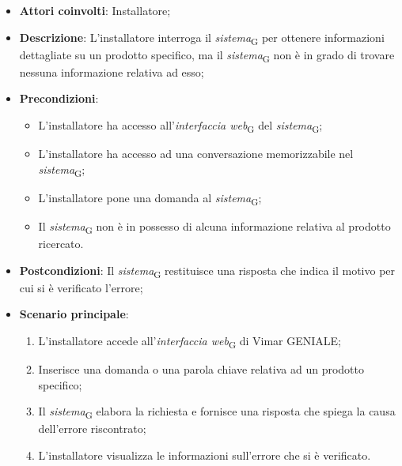 \begin{itemize}
    \item \textbf{Attori coinvolti}: Installatore;
    \item \textbf{Descrizione}: L’installatore interroga il \textit{sistema}\textsubscript{G} per ottenere informazioni dettagliate su un prodotto specifico, ma il \textit{sistema}\textsubscript{G} non è in grado di trovare nessuna informazione relativa ad esso;
    \item \textbf{Precondizioni}: 
        \begin{itemize}
            \item L’installatore ha accesso all’\textit{interfaccia web}\textsubscript{G} del \textit{sistema}\textsubscript{G};
            \item L’installatore ha accesso ad una conversazione memorizzabile nel \textit{sistema}\textsubscript{G};
            \item L’installatore pone una domanda al \textit{sistema}\textsubscript{G};
            \item Il \textit{sistema}\textsubscript{G} non è in possesso di alcuna informazione relativa al prodotto ricercato.
        \end{itemize}
    \item \textbf{Postcondizioni}: Il \textit{sistema}\textsubscript{G} restituisce una risposta che indica il motivo per cui si è verificato l’errore;
    \item \textbf{Scenario principale}:
    \begin{enumerate}
    \item L’installatore accede all’\textit{interfaccia web}\textsubscript{G} di Vimar GENIALE;
    \item Inserisce una domanda o una parola chiave relativa ad un prodotto specifico;
    \item Il \textit{sistema}\textsubscript{G} elabora la richiesta e fornisce una risposta che spiega la causa dell'errore riscontrato;
    \item L’installatore visualizza le informazioni sull’errore che si è verificato.
    \end{enumerate}
\end{itemize}


